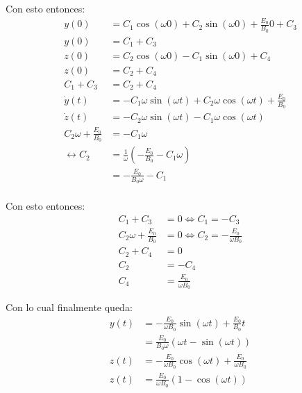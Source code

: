 \documentclass{report}
\begin{document}
Con esto entonces:
\begin{align*}
	y(0) &= C_1 \cos \left(\omega 0 \right) + C_2 \sin\left( \omega 0 \right) + \frac{E_0}{B_0} 0 + C_3\\
	y(0) &= C_1 + C_3\\
	z(0) &= C_2 \cos \left(\omega 0 \right) - C_1 \sin\left( \omega 0 \right) + C_4\\
	z(0) &= C_2 + C_4\\
	C_1 + C_3 &= C_2 + C_4\\
	\dot{y}(t) &= - C_1\omega \sin \left(\omega t \right) + C_2 \omega\cos\left( \omega t \right) + \frac{E_0}{B_0}\\
	\dot{z}(t) &= - C_2\omega \sin \left(\omega t \right) - C_1 \omega\cos\left( \omega t \right)\\
	C_2 \omega + \frac{E_0}{B_0} &= - C_1 \omega\\
	\leftrightarrow C_2 &= \frac{1}{\omega} \left( - \frac{E_0}{B_0} - C_1 \omega\right)\\
	&= - \frac{E_0}{B_0 \omega} - C_1\\
\end{align*}

Con esto entonces:
\begin{align*}
	C_1 + C_3 &= 0 \iff C_1 = - C_3\\
	C_2 \omega + \frac{E_0}{B_0} &= 0 \iff C_2 = - \frac{E_0}{\omega B_0}\\
	C_2 + C_4 &= 0\\
	C_2 &= - C_4\\
	C_4 &= \frac{E_0}{\omega B_0}
\end{align*}

Con lo cual finalmente queda:
\begin{align*}
	y(t) &= - \frac{E_0}{\omega B_0} \sin \left(\omega t\right) + \frac{E_0}{B_0} t\\
	&= \frac{E_0}{B_0 \omega} \left( \omega t - \sin \left(\omega t \right)\right)\\
	z(t) &= - \frac{E_0}{\omega B_0} \cos\left(\omega t\right) + \frac{E_0}{\omega B_0}\\
	z(t) &= \frac{E_0}{\omega B_0} \left( 1 - \cos\left(\omega t\right)\right)
\end{align*}

\section{}
\end{document}
